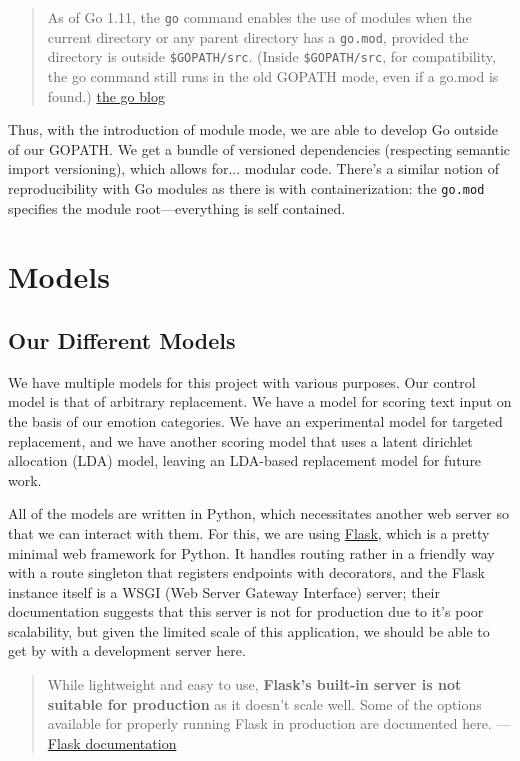 \documentclass[11pt, twoside, reqno]{book}
\begin{document}
\begin{quote}
As of Go 1.11, the \texttt{go} command enables the use of modules when the current directory or any parent directory has a \texttt{go.mod}, provided the directory is outside \texttt{\$GOPATH/src}. (Inside \texttt{\$GOPATH/src}, for compatibility, the go command still runs in the old GOPATH mode, even if a go.mod is found.) \href{https://blog.golang.org/using-go-modules}{the go blog}
\end{quote}

Thus, with the introduction of module mode, we are able to develop Go outside of our GOPATH. We get a bundle of versioned dependencies (respecting semantic import versioning), which allows for... modular code. There's a similar notion of reproducibility with Go modules as there is with containerization: the \texttt{go.mod} specifies the module root—everything is self contained.

\chapter{Models}

\section{Our Different Models}

We have multiple models for this project with various purposes. Our control model is that of arbitrary replacement. We have a model for scoring text input on the basis of our emotion categories. We have an experimental model for targeted replacement, and we have another scoring model that uses a latent dirichlet allocation (LDA) model, leaving an LDA-based replacement model for future work.

All of the models are written in Python, which necessitates another web server so that we can interact with them. For this, we are using \href{https://flask.palletsprojects.com/en/1.1.x/}{Flask}, which is a pretty minimal web framework for Python. It handles routing rather in a friendly way with a route singleton that registers endpoints with decorators, and the Flask instance itself is a WSGI (Web Server Gateway Interface) server; their documentation suggests that this server is not for production due to it's poor scalability, but given the limited scale of this application, we should be able to get by with a development server here.

\begin{quote}
While lightweight and easy to use, \textbf{Flask’s built-in server is not suitable for production} as it doesn’t scale well. Some of the options available for properly running Flask in production are documented here. — \href{https://flask.palletsprojects.com/en/1.1.x/}{Flask documentation}
\end{quote}
\end{document}
